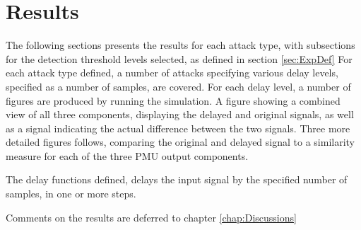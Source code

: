 \chapter{Results} \label{chap:Results}


The following sections presents the results for each attack type, with subsections for the detection threshold levels selected, as defined in section \ref{sec:ExpDef} 
For each attack type defined, a number of attacks specifying various delay levels, specified as a number of samples, are covered.
For each delay level, a number of figures are produced by running the simulation.
A figure showing a combined view of all three components, displaying the delayed and original signals, as well as a signal indicating the actual difference between the two signals.  Three more detailed figures follows, comparing the original and delayed signal to a similarity measure for each of the three PMU output components.

The delay functions defined, delays the input signal by the specified number of samples, in one or more steps.





Comments on the results are deferred to chapter \ref{chap:Discussions}
\newcommand{\locateResults}{PMUsim-figures/Cont/}

\renewcommand{\locateResults}{PMUsim-figures/Cont/DelayOf_0}



\renewcommand{\locateResults}{PMUsim-figures/Square/DelayOf_0}





\renewcommand{\locateResults}{PMUsim-figures/Ascending/DelayOf_1}


\renewcommand{\locateResults}{PMUsim-figures/Ascending/DelayOf_2}


\renewcommand{\locateResults}{PMUsim-figures/Cont/DelayOf_2}


